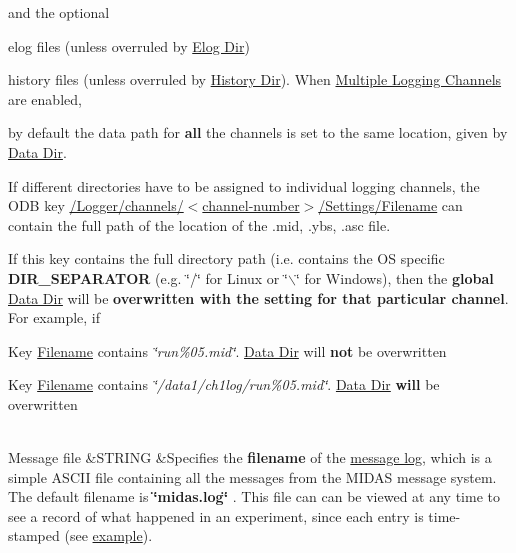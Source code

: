 \begin{table}[h]
\begin{TabularC}{3}
and the optional
\begin{DoxyItemize}
\item elog files (unless overruled by \hyperlink{F_Elog_F_Logger_Elog_Dir}{Elog Dir})
\item history files (unless overruled by \hyperlink{F_History_logging_F_Logger_History_Dir}{History Dir}). \label{F_Logging_Data_F_Logger_Dir_Separator}
\hypertarget{F_Logging_Data_F_Logger_Dir_Separator}{}
  When \hyperlink{F_Logging_Data_F_Logger_multiple_logging_channels}{Multiple Logging Channels} are enabled,
\begin{DoxyItemize}
\item by default the data path for {\bfseries all} the channels is set to the same location, given by \hyperlink{F_Logging_Data_F_Logger_Data_Dir}{Data Dir}.
\item If different directories have to be assigned to individual logging channels, the ODB key \hyperlink{F_Logging_Data_F_Logger_CS_Filename}{/Logger/channels/$<$channel-\/number$>$/Settings/Filename} can contain the full path of the location of the {\bfseries }.mid, .ybs, .asc file.
\item If this key contains the full directory path (i.e. contains the OS specific {\bfseries DIR\_\-SEPARATOR} (e.g. \char`\"{}/\char`\"{} for Linux or \char`\"{}$\backslash$\char`\"{} for Windows), then the {\bfseries global} \hyperlink{F_Logging_Data_F_Logger_Data_Dir}{Data Dir} will be {\bfseries overwritten with the setting for that particular channel}. For example, if
\begin{DoxyItemize}
\item Key \hyperlink{F_Logging_Data_F_Logger_CS_Filename}{Filename} contains {\itshape \char`\"{}run\%05.mid\char`\"{}\/}. \hyperlink{F_Logging_Data_F_Logger_Data_Dir}{Data Dir} will {\bfseries not} be overwritten
\item Key \hyperlink{F_Logging_Data_F_Logger_CS_Filename}{Filename} contains {\itshape \char`\"{}/data1/ch1log/run\%05.mid\char`\"{}\/}. \hyperlink{F_Logging_Data_F_Logger_Data_Dir}{Data Dir} {\bfseries will} be overwritten   
\end{DoxyItemize}
\end{DoxyItemize}
\end{DoxyItemize}\\
\label{F_Logging_Data_idx_midas_message-file_name}
\hypertarget{F_Logging_Data_idx_midas_message-file_name}{}
 \label{F_Logging_Data_F_Logger_Message_File}
\hypertarget{F_Logging_Data_F_Logger_Message_File}{}
 Message file  &STRING  &Specifies the {\bfseries filename} of the \hyperlink{F_Messaging_F_Log_File}{message log}, which is a simple ASCII file containing all the messages from the MIDAS message system. The default filename is {\bfseries  \char`\"{}midas.log\char`\"{} }. This file can can be viewed at any time to see a record of what happened in an experiment, since each entry is time-\/stamped (see \hyperlink{F_Messaging_F_Log_File}{example}).  


\end{TabularC}
\end{table}
